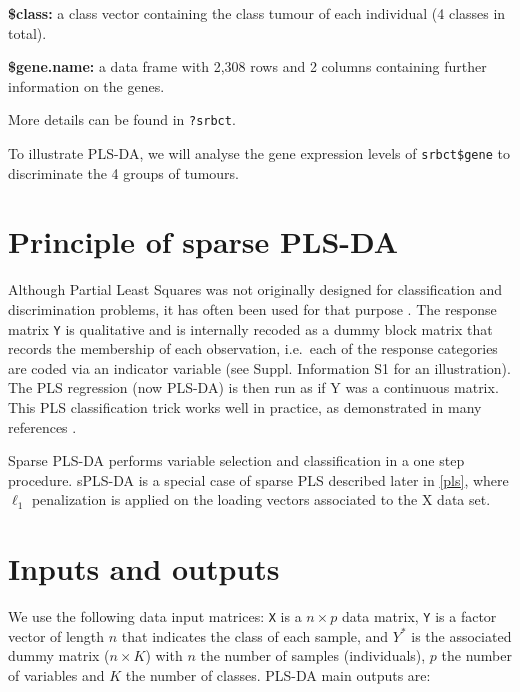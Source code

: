 \documentclass[]{book}
\begin{document}
\textbf{\$class:} a class vector containing the class tumour of each individual (4 classes in total).

\textbf{\$gene.name:} a data frame with 2,308 rows and 2 columns containing further information on the genes.

More details can be found in \texttt{?srbct}.

To illustrate PLS-DA, we will analyse the gene expression levels of \texttt{srbct\$gene} to discriminate the 4 groups of tumours.

\hypertarget{principle-of-sparse-pls-da}{%
\section{Principle of sparse PLS-DA}\label{principle-of-sparse-pls-da}}

Although Partial Least Squares was not originally designed for classification and discrimination problems, it has often been used for that purpose \citep{Ngu02a, Tan04}. The response matrix \texttt{Y} is qualitative and is internally recoded as a dummy block matrix that records the membership of each observation, i.e.~each of the response categories are coded via an indicator variable (see \citep{mixomics} Suppl. Information S1 for an illustration). The PLS regression (now PLS-DA) is then run as if Y was a continuous matrix. This PLS classification trick works well in practice, as demonstrated in many references \citep{Bar03, Ngu02a, Bou07, Chung10}.

Sparse PLS-DA \citep{Lec11} performs variable selection and classification in a one step procedure. sPLS-DA is a special case of sparse PLS described later in \ref{pls}, where \(\ell_1\) penalization is applied on the loading vectors associated to the X data set.

\hypertarget{inputs-and-outputs}{%
\section{Inputs and outputs}\label{inputs-and-outputs}}

We use the following data input matrices: \texttt{X} is a \(n \times p\) data matrix, \texttt{Y} is a factor vector of length \(n\) that indicates the class of each sample, and \(Y^*\) is the associated dummy matrix (\(n \times K\)) with \(n\) the number of samples (individuals), \(p\) the number of variables and \(K\) the number of classes. PLS-DA main outputs are:
\end{document}
